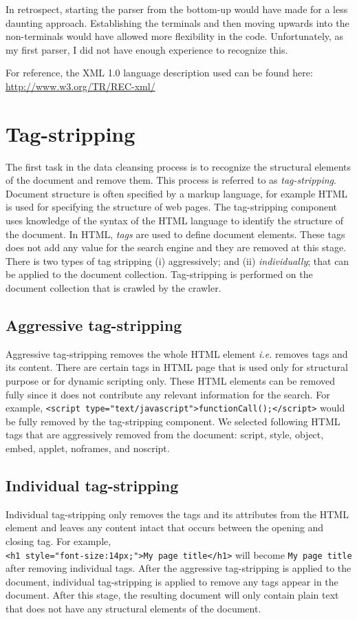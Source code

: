 \documentclass[letterpaper,11pt,twoside]{article}
\begin{document}
In retrospect, starting the parser from the bottom-up would have made for a less daunting approach. Establishing the terminals and then moving upwards into the non-terminals would have allowed more flexibility in the code. Unfortunately, as my first parser, I did not have enough experience to recognize this.

For reference, the XML 1.0 language description used can be found here: \url{http://www.w3.org/TR/REC-xml/}

\section{Tag-stripping}
The first task in the data cleansing process is to recognize the structural elements of the document and remove them. This process is referred to as \emph{tag-stripping}. Document structure is often specified by a markup language, for example HTML is used for specifying the structure of web pages. The tag-stripping component uses knowledge of the syntax of the HTML language to identify the structure of the document. In HTML, \emph{tags} are used to define document elements. These tags does not add any value for the search engine and they are removed at this stage. There is two types of tag stripping (i) aggressively; and (ii) \emph{individually}; that can be applied to the document collection. Tag-stripping is performed on the document collection that is crawled by the crawler.

\subsection{Aggressive tag-stripping} 
Aggressive tag-stripping removes the whole HTML element \emph{i.e.} removes tags and its content. There are certain tags in HTML page that is used only for structural purpose or for dynamic scripting only. These HTML elements can be removed fully since it does not contribute any relevant information for the search. For example, \verb|<script type="text/javascript">functionCall();</script>| would be fully removed by the tag-stripping component. We selected following HTML tags that are aggressively removed from the document: script, style, object, embed, applet, noframes, and noscript. 

\subsection{Individual tag-stripping}
Individual tag-stripping only removes the tags and its attributes from the HTML element and leaves any content intact that occurs between the opening and closing tag. For example, \\\verb|<h1 style="font-size:14px;">My page title</h1>| will become \verb|My page title| after removing individual tags. After the aggressive tag-stripping is applied to the document, individual tag-stripping is applied to remove any tags appear in the document. After this stage, the resulting document will only contain plain text that does not have any structural elements of the document. 
\end{document}
